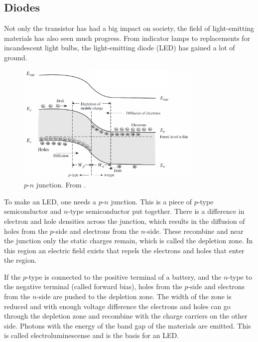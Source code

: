 \subsection{Diodes}
Not only the transistor has had a big impact on society, the field of light-emitting materials has also seen much progress. From indicator lamps to replacements for incandescent light bulbs, the light-emitting diode (LED) has gained a lot of ground.

\begin{figure}[!ht]
 \begin{center}
  \includegraphics[width=0.8\textwidth]{pn_junction}
  \caption{$p$-$n$ junction. From \citet{vanweesbook}.}
  \label{fig:pn_junction}
 \end{center}
\end{figure}

To make an LED, one needs a $p$-$n$ junction. This is a piece of $p$-type semiconductor and $n$-type semiconductor put together. There is a difference in electron and hole densities across the junction, which results in the diffusion of holes from the $p$-side and electrons from the $n$-side. These recombine and near the junction only the static charges remain, which is called the depletion zone. In this region an electric field exists that repels the electrons and holes that enter the region.

If the $p$-type is connected to the positive terminal of a battery, and the $n$-type to the negative terminal (called forward bias), holes from the $p$-side and electrons from the $n$-side are pushed to the depletion zone. The width of the zone is reduced and with enough voltage difference the electrons and holes can go through the depletion zone and recombine with the charge carriers on the other side. Photons with the energy of the band gap of the materials are emitted. This is called electroluminescense and is the basis for an LED.

